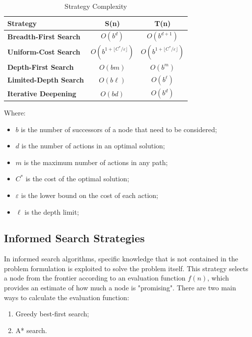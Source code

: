 \documentclass{article}
\begin{document}
\begin{table}[h]
    \centering
    \begin{tabular}{l||c|c}
        Strategy & S(n) & T(n) \\ \hline \hline
        \textbf{Breadth-First Search} & \(O(b^d)\)  & \(O(b^{d+1})\) \\ \hline
        \textbf{Uniform-Cost Search} & \(O(b^{1+\lfloor C^*/\varepsilon \rfloor})\) & \(O(b^{1+\lfloor C^*/\varepsilon \rfloor})\) \\ \hline
        \textbf{Depth-First Search} & \(O(bm)\) & \(O(b^m)\) \\ \hline
        \textbf{Limited-Depth Search} & \(O(b\ell)\) & \(O(b^\ell)\) \\ \hline
        \textbf{Iterative Deepening} & \(O(bd)\) & \(O(b^d)\) \\
    \end{tabular}
    \caption{Strategy Complexity}
    \label{tab:strategy_complexity}
\end{table}

Where:
\begin{itemize}
    \item \(b\) is the number of successors of a node that need to be considered;
    \item \(d\) is the number of actions in an optimal solution;
    \item \(m\) is the maximum number of actions in any path;
    \item \(C^*\) is the cost of the optimal solution;
    \item \(\varepsilon\) is the lower bound on the cost of each action;
    \item \(\ell\) is the depth limit;
\end{itemize}

\subsection{Informed Search Strategies}
In informed search algorithms, specific knowledge that is not contained in the problem formulation is exploited to solve the problem itself. This strategy selects a node from the frontier according to an evaluation function \(f(n)\), which provides an estimate of how much a node is "promising". There are two main ways to calculate the evaluation function:
\begin{enumerate}
    \item Greedy best-first search;
    \item A* search.
\end{enumerate}
\end{document}
